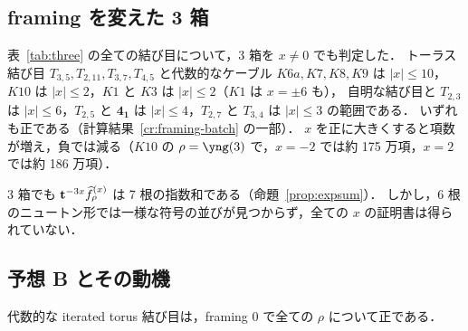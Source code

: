 \subsection{framing を変えた 3 箱}
\begin{compresult}\label{cr:three-x}
表~\ref{tab:three} の全ての結び目について，3 箱を $x\neq0$ でも判定した．
トーラス結び目 $T_{3,5},T_{2,11},T_{3,7},T_{4,5}$ と代数的なケーブル $K6a,K7,K8,K9$ は $|x|\le10$，$K10$ は $|x|\le2$，$K1$ と $K3$ は $|x|\le2$（$K1$ は $x=\pm6$ も），
自明な結び目と $T_{2,3}$ は $|x|\le6$，$T_{2,5}$ と $\mathbf{4_1}$ は $|x|\le4$，$T_{2,7}$ と $T_{3,4}$ は $|x|\le3$ の範囲である．
いずれも正である（計算結果~\ref{cr:framing-batch} の一部）．
$x$ を正に大きくすると項数が増え，負では減る（$K10$ の $\rho=\yng(3)$ で，$x=-2$ では約 175 万項，$x=2$ では約 186 万項）．
\end{compresult}
3 箱でも $\mathbf{t}^{-3x}\widehat{f}^{(x)}_\rho$ は 7 根の指数和である（命題~\ref{prop:expsum}）．
しかし，6 根のニュートン形では一様な符号の並びが見つからず，全ての $x$ の証明書は得られていない．

\subsection{予想 B とその動機}\label{sec:conjB}
\begin{tcolorbox}
\begin{conjecture}\label{conj:B}
代数的な iterated torus 結び目は，framing 0 で全ての $\rho$ について正である．
\end{conjecture}
\end{tcolorbox}

